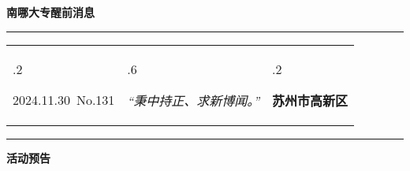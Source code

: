 \documentclass[letterpaper, 12pt]{article}
\begin{document}
\begin{center}
    \Huge\textbf{南哪大专醒前消息}
\end{center}
\vspace{4mm}
\hrule
\renewcommand\tabularxcolumn[1]{m{#1}}
\begin{tabularx}{\textwidth}{>{\hsize.2\hsize}X>{\hsize.6\hsize}X>{\hsize.2\hsize}X}
    \begin{flushleft}
        2024.11.30\, No.131
    \end{flushleft}
    &
    \begin{center}
        \textit{“秉中持正、求新博闻。”}
    \end{center}
    &
    \begin{flushright}
        \textbf{苏州市高新区}
    \end{flushright}
\end{tabularx}
\vspace{-3.5mm}
\hrule
\vspace{4mm}
\centerline{\huge\textbf{活动预告}}
\end{document}
